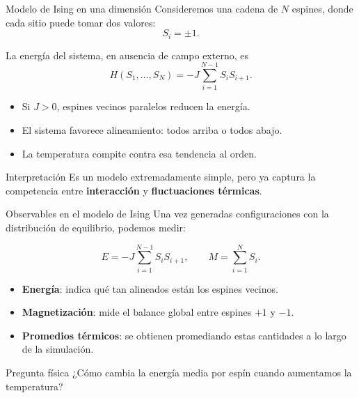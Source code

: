 \begin{frame}{Modelo de Ising en una dimensión}
\justifying
Consideremos una cadena de $N$ espines, donde cada sitio puede tomar dos valores:
\[
S_i = \pm 1.
\]

La energía del sistema, en ausencia de campo externo, es
\[
H(S_1,\ldots,S_N) = -J\sum_{i=1}^{N-1} S_i S_{i+1}.
\]

\begin{itemize}
    \item Si $J>0$, espines vecinos paralelos reducen la energía.
    \item El sistema favorece alineamiento: todos arriba o todos abajo.
    \item La temperatura compite contra esa tendencia al orden.
\end{itemize}

\begin{alertblock}{Interpretación}
Es un modelo extremadamente simple, pero ya captura la competencia entre \textbf{interacción} y \textbf{fluctuaciones térmicas}.
\end{alertblock}
\end{frame}

\begin{frame}{Observables en el modelo de Ising}
\small
Una vez generadas configuraciones con la distribución de equilibrio, podemos medir:

\begin{equation*}
E = -J\sum_{i=1}^{N-1} S_iS_{i+1},
\qquad
M = \sum_{i=1}^{N} S_i.
\end{equation*}

\begin{itemize}
    \item \textbf{Energía}: indica qué tan alineados están los espines vecinos.
    \item \textbf{Magnetización}: mide el balance global entre espines $+1$ y $-1$.
    \item \textbf{Promedios térmicos}: se obtienen promediando estas cantidades a lo largo de la simulación.
\end{itemize}

\begin{block}{Pregunta física}
¿Cómo cambia la energía media por espín cuando aumentamos la temperatura?
\end{block}
\end{frame}


